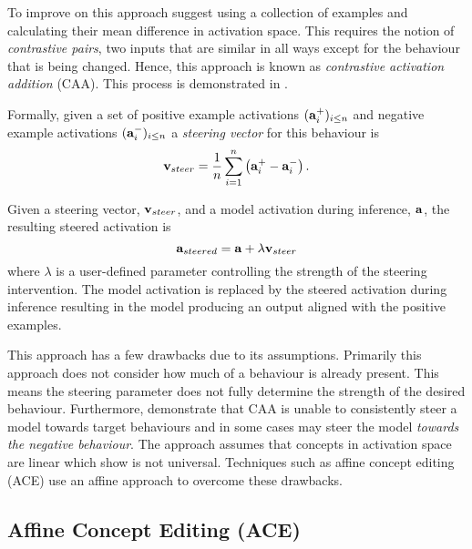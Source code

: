 To improve on this approach \citet{caa} suggest using a collection of examples and calculating their mean difference in activation space.
This requires the notion of \emph{contrastive pairs}, two inputs that are similar in all ways except for the behaviour that is being changed.
Hence, this approach is known as \emph{contrastive activation addition} (CAA).
This process is demonstrated in .

Formally, given a set of positive example activations $(\mathbf{a}_i^+)_{i\le n}$ and negative example activations $(\mathbf{a}_i^-)_{i\le n}$ a \emph{steering vector} for this behaviour is
\[\mathbf{v}_{steer} = \frac{1}{n}\sum_{i=1}^{n}\left(\mathbf{a}_i^+ - \mathbf{a}_i^-\right).\]

Given a steering vector, $\mathbf{v}_{steer}$, and a model activation during inference, $\mathbf{a}$, the resulting steered activation is
\begin{equation}
    \label{eq:caa}
    \mathbf{a}_{steered} = \mathbf{a} + \lambda\mathbf{v}_{steer}
\end{equation}
where $\lambda$ is a user-defined parameter controlling the strength of the steering intervention.
The model activation is replaced by the steered activation during inference resulting in the model producing an output aligned with the positive examples.

This approach has a few drawbacks \citep{steerability, ace, non-linear-features} due to its assumptions.
Primarily this approach does not consider how much of a behaviour is already present.
This means the steering parameter does not fully determine the strength of the desired behaviour.
Furthermore, \citet{steerability} demonstrate that CAA is unable to consistently steer a model towards target behaviours and in some cases may steer the model \emph{towards the negative behaviour}.
The approach assumes that concepts in activation space are linear which \citet{non-linear-features} show is not universal.
Techniques such as affine concept editing (ACE)  use an affine approach to overcome these drawbacks.

\subsection{Affine Concept Editing (ACE)}
\label{sec:ace}

